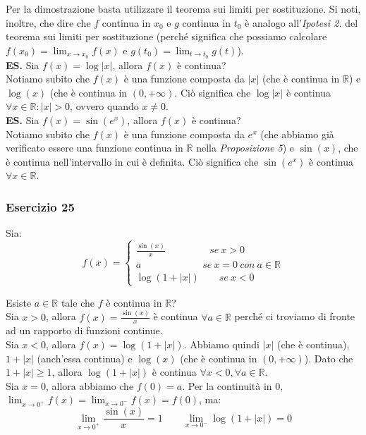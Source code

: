 \documentclass{article}
\begin{document}
\noindent Per la dimostrazione basta utilizzare il teorema sui limiti per sostituzione. Si noti, inoltre, che dire che $f$ continua in $x_0$ e $g$ continua in $t_0$ è analogo all'\textit{Ipotesi 2.} del teorema sui limiti per sostituzione (perché significa che possiamo calcolare $f(x_0) = \lim_{x \to x_0} f(x)$ e $g(t_0) = \lim_{t \to t_0} g(t)$). \\

\noindent\textbf{ES.} Sia $f(x) = \log|x|$, allora $f(x)$ è continua? \\
\noindent Notiamo subito che $f(x)$ è una funzione composta da $|x|$ (che è continua in $\mathbb{R}$) e $\log(x)$ (che è continua in $(0, +\infty)$. Ciò significa che $\log|x|$ è continua $\forall x \in \mathbb{R} : |x| > 0$, ovvero quando $x \neq 0$.\\

\noindent\textbf{ES.} Sia $f(x) = \sin(e^x)$, allora $f(x)$ è continua?\\
\noindent Notiamo subito che $f(x)$ è una funzione composta da $e^x$ (che abbiamo già verificato essere una funzione continua in $\mathbb{R}$ nella \textit{Proposizione 5}) e $\sin(x)$, che è continua nell'intervallo in cui è definita. Ciò significa che $\sin(e^x)$ è continua $\forall x \in \mathbb{R}$.

\subsubsection{Esercizio 25}
Sia:
\begin{equation*}
    f(x) = \begin{cases}
        \frac{\sin(x)}{x} \qquad \qquad \ \ se \ x > 0 \\
        a \qquad \qquad \qquad \ se \ x = 0 \ con \ a \in \mathbb{R} \\
        \log(1 + |x|) \qquad se \ x < 0
    \end{cases}
\end{equation*}

\noindent Esiste $a \in \mathbb{R}$ tale che $f$ è continua in $\mathbb{R}$?\\

\noindent Sia $x > 0$, allora $f(x) = \frac{\sin(x)}{x}$ è continua $\forall a \in \mathbb{R}$ perché ci troviamo di fronte ad un rapporto di funzioni continue. \\
\noindent Sia $x < 0$, allora $f(x) = \log(1 + |x|)$. Abbiamo quindi $|x|$ (che è continua), $1 + |x|$ (anch'essa continua) e $\log(x)$ (che è continua in $(0, +\infty)$). Dato che $1 + |x| \geq 1$, allora $\log(1 + |x|)$ è continua $\forall x < 0, \forall a \in \mathbb{R}$.\\
\noindent Sia $x = 0$, allora abbiamo che $f(0) = a$. Per la continuità in $0$, $\lim_{x \to 0^+} f(x) = \lim_{x \to 0^-} f(x) = f(0)$, ma:
\begin{equation*}
    \lim_{x \to 0^+} \frac{\sin(x)}{x} = 1 \qquad \lim_{x \to 0^-} \log(1 + |x|) = 0
\end{equation*}
\end{document}
